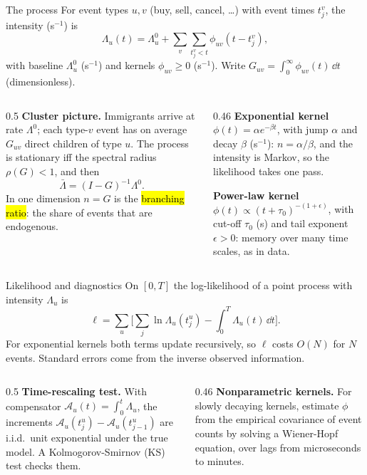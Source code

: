 \documentclass[aspectratio=169,10pt]{beamer}
\begin{document}
\begin{frame}{The process}
  \small
  For event types $u, v$ (buy, sell, cancel, \ldots) with event times $t^v_j$, the intensity (s$^{-1}$) is
  \[ \Lambda_u(t) = \Lambda^0_u + \sum_v \sum_{t^v_j < t} \phi_{uv}(t - t^v_j), \]
  with baseline $\Lambda^0_u$ (s$^{-1}$) and kernels $\phi_{uv} \geq 0$ (s$^{-1}$). Write $G_{uv} = \int_0^\infty \phi_{uv}(t)\,\dd t$ (dimensionless).
  \begin{columns}[T]
    \begin{column}{0.5\textwidth}
      \textbf{Cluster picture.} Immigrants arrive at rate $\Lambda^0$; each type-$v$ event has on average $G_{uv}$ direct children of type $u$. The process is stationary iff the spectral radius $\rho(G) < 1$, and then
      \[ \bar\Lambda = (I - G)^{-1}\Lambda^0 . \]
      In one dimension $n = G$ is the \hl{branching ratio}: the share of events that are endogenous.
    \end{column}
    \begin{column}{0.46\textwidth}
      \textbf{Exponential kernel} $\phi(t) = \alpha e^{-\beta t}$, with jump $\alpha$ and decay $\beta$ (s$^{-1}$): $n = \alpha/\beta$, and the intensity is Markov, so the likelihood takes one pass.

      \vspace{0.3em}
      \textbf{Power-law kernel} $\phi(t) \propto (t + \tau_0)^{-(1+\epsilon)}$, with cut-off $\tau_0$ (s) and tail exponent $\epsilon > 0$: memory over many time scales, as in data.
    \end{column}
  \end{columns}
\end{frame}

\begin{frame}{Likelihood and diagnostics}
  \small
  On $[0, T]$ the log-likelihood of a point process with intensity $\Lambda_u$ is
  \[ \ell = \sum_u\Big[\sum_j \ln\Lambda_u(t^u_j) - \int_0^T \Lambda_u(t)\,\dd t\Big]. \]
  For exponential kernels both terms update recursively, so $\ell$ costs $O(N)$ for $N$ events. Standard errors come from the inverse observed information.
  \vspace{0.3em}
  \begin{columns}[T]
    \begin{column}{0.5\textwidth}
      \textbf{Time-rescaling test.} With compensator $\mathcal{A}_u(t) = \int_0^t \Lambda_u$, the increments $\mathcal{A}_u(t^u_j) - \mathcal{A}_u(t^u_{j-1})$ are i.i.d.\ unit exponential under the true model. A Kolmogorov-Smirnov (KS) test checks them.
    \end{column}
    \begin{column}{0.46\textwidth}
      \textbf{Nonparametric kernels.} For slowly decaying kernels, \citet{bacry2016estimation} estimate $\phi$ from the empirical covariance of event counts by solving a Wiener-Hopf equation, over lags from microseconds to minutes.
    \end{column}
  \end{columns}
\end{frame}
\end{document}
